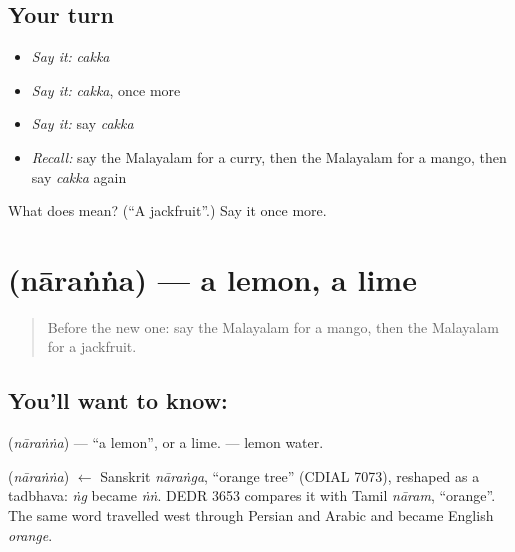 \subsection*{Your turn}
\begin{itemize}
\raggedright
  \item \emph{Say it:} \emph{cakka}
  \item \emph{Say it:} \emph{cakka}, once more
  \item \emph{Say it:} say \emph{cakka}
  \item \emph{Recall:} say the Malayalam for a curry, then the Malayalam for a mango, then say \emph{cakka} again
\end{itemize}

\begin{tcolorbox}[breakable,colback=teal!4,colframe=teal!35!black,title={Before you move on}]
What does  mean? (\textquotedblleft{}A jackfruit\textquotedblright{}.) Say it once more.
\end{tcolorbox}
\section[\texorpdfstring{\ml{നാരങ്ങ} (nāraṅṅa)}{നാരങ്ങ (nāraṅṅa)}]{ (nāraṅṅa) — a lemon, a lime}

\label{lesson:ML-C133-lemon}



\begin{quote}
Before the new one: say the Malayalam for a mango, then the Malayalam for a jackfruit.
\end{quote}

\subsection*{You'll want to know: }
\textbf{} (\emph{nāraṅṅa}) — \textquotedblleft{}a lemon\textquotedblright{}, or a lime. \textbf{ } — lemon water.

\begin{cousinweb}
\textbf{} (\emph{nāraṅṅa}) $\leftarrow$ Sanskrit \emph{nāraṅga}, \textquotedblleft{}orange tree\textquotedblright{} (CDIAL 7073), reshaped as a tadbhava: \emph{ṅg} became \emph{ṅṅ}. DEDR 3653 compares it with Tamil \emph{nāram}, \textquotedblleft{}orange\textquotedblright{}. The same word travelled west through Persian and Arabic and became English \emph{orange}.
\end{cousinweb}

